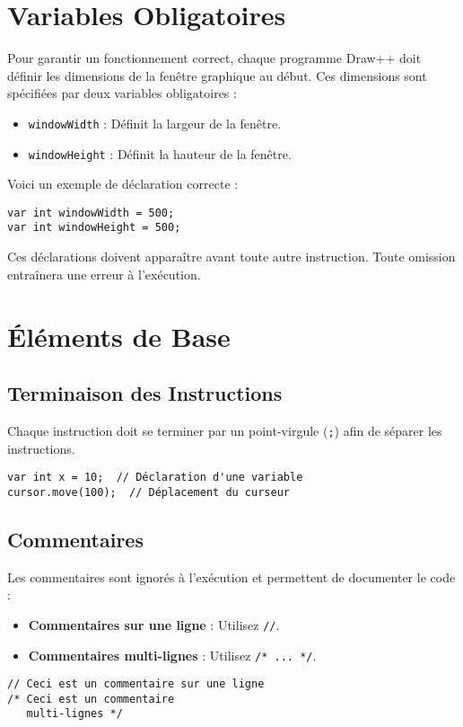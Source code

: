 \documentclass[12pt,a4paper]{report}
\begin{document}
\section{Variables Obligatoires}
Pour garantir un fonctionnement correct, chaque programme Draw++ doit définir les dimensions de la fenêtre graphique au début. Ces dimensions sont spécifiées par deux variables obligatoires :
\begin{itemize}
    \item \texttt{windowWidth} : Définit la largeur de la fenêtre.
    \item \texttt{windowHeight} : Définit la hauteur de la fenêtre.
\end{itemize}
Voici un exemple de déclaration correcte :
\begin{lstlisting}[language=Draw++]
var int windowWidth = 500;
var int windowHeight = 500;
\end{lstlisting}
Ces déclarations doivent apparaître avant toute autre instruction. Toute omission entraînera une erreur à l'exécution.

\section{Éléments de Base}

\subsection{Terminaison des Instructions}
Chaque instruction doit se terminer par un point-virgule (\texttt{;}) afin de séparer les instructions.
\begin{lstlisting}[language=Draw++]
var int x = 10;  // Déclaration d'une variable
cursor.move(100);  // Déplacement du curseur
\end{lstlisting}

\subsection{Commentaires}
Les commentaires sont ignorés à l'exécution et permettent de documenter le code :
\begin{itemize}
    \item \textbf{Commentaires sur une ligne} : Utilisez \texttt{//}.
    \item \textbf{Commentaires multi-lignes} : Utilisez \texttt{/* ... */}.
\end{itemize}
\begin{lstlisting}[language=Draw++]
// Ceci est un commentaire sur une ligne
/* Ceci est un commentaire
   multi-lignes */
\end{lstlisting}
\end{document}
